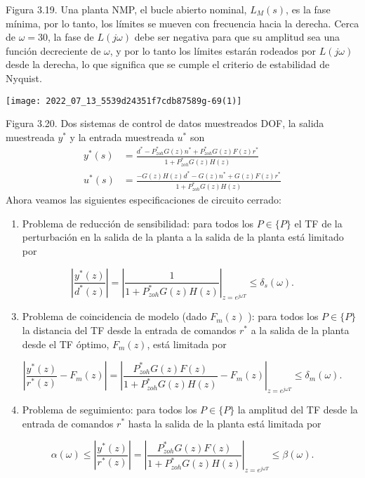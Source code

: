 Figura 3.19. Una planta NMP, el bucle abierto nominal, $L_{M}(s)$, es la fase mínima, por lo tanto, los límites se mueven con frecuencia hacia la derecha. Cerca de $\omega=30$, la fase de $L(j \omega)$ debe ser negativa para que su amplitud sea una función decreciente de $\omega$, y por lo tanto los límites estarán rodeados por $L(j \omega)$ desde la derecha, lo que significa que se cumple el criterio de estabilidad de Nyquist.

\texttt{[image: 2022\_07\_13\_5539d24351f7cdb87589g-69(1)]}

Figura 3.20. Dos sistemas de control de datos muestreados DOF, la salida muestreada $y^{*}$ y la entrada muestreada $u^{*}$ son
$$
\begin{aligned}
y^{*}(s) &=\frac{d^{*}-P_{z o h}^{*} G(z) n^{*}+P_{z o h}^{*} G(z) F(z) r^{*}}{1+P_{z o h}^{*} G(z) H(z)} \\
u^{*}(s) &=\frac{-G(z) H(z) d^{*}-G(z) n^{*}+G(z) F(z) r^{*}}{1+P_{z o h}^{*} G(z) H(z)}
\end{aligned}
$$
Ahora veamos las siguientes especificaciones de circuito cerrado:

\begin{enumerate}
  \item Problema de reducción de sensibilidad: para todos los $P \in\{P\}$ el TF de la perturbación en la salida de la planta a la salida de la planta está limitado por
\end{enumerate}
$$
\left|\frac{y^{*}(z)}{d^{*}(z)}\right|=\left|\frac{1}{1+P_{z o h}^{*} G(z) H(z)}\right|_{z=e^{j \omega T}} \leq \delta_{s}(\omega) .
$$

\begin{enumerate}
  \setcounter{enumi}{2}
  \item Problema de coincidencia de modelo (dado $F_{m}(z)$ ): para todos los $P \in\{P\}$ la distancia del TF desde la entrada de comandos $r^{*}$ a la salida de la planta desde el TF óptimo, $F_{m}(z)$, está limitada por
\end{enumerate}
$$
\left|\frac{y^{*}(z)}{r^{*}(z)}-F_{m}(z)\right|=\left|\frac{P_{z o h}^{*} G(z) F(z)}{1+P_{z o h}^{*} G(z) H(z)}-F_{m}(z)\right|_{z=e^{j \omega T}} \leq \delta_{m}(\omega) .
$$

\begin{enumerate}
  \setcounter{enumi}{3}
  \item Problema de seguimiento: para todos los $P \in\{P\}$ la amplitud del TF desde la entrada de comandos $r^{*}$ hasta la salida de la planta está limitada por
\end{enumerate}
$$
\alpha(\omega) \leq\left|\frac{y^{*}(z)}{r^{*}(z)}\right|=\left|\frac{P_{z o h}^{*} G(z) F(z)}{1+P_{z o h}^{*} G(z) H(z)}\right|_{z=e^{j \omega T}} \leq \beta(\omega) .
$$

